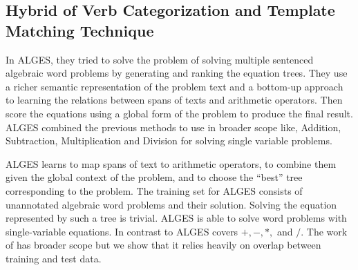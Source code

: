 \documentclass[document.tex]{subfiles}
\begin{document}
\subsection{Hybrid of Verb Categorization and Template Matching Technique}
\noindent In ALGES\cite{3}, they tried to solve the problem of solving multiple sentenced algebraic word problems by generating and ranking the equation trees. They use a richer semantic representation of the problem text and a bottom-up approach to learning the relations between spans of texts and arithmetic operators. Then score the equations using a global form of the problem to produce the final result. ALGES combined the previous methods to use in broader scope like, Addition, Subtraction, Multiplication and Division for solving single variable problems.

ALGES learns to map spans of text to arithmetic operators, to combine them given the global context of the problem, and to
choose the “best” tree corresponding to the problem.
The training set for ALGES consists of unannotated
algebraic word problems and their solution. Solving the equation represented by such a tree is trivial.
ALGES is able to solve word problems with single-variable equations.
In contrast to \cite{1} ALGES covers $ +, -, *, $ and $/$. The work of \cite{2} has broader scope but we show that it relies heavily on overlap between training and test data.
\end{document}
